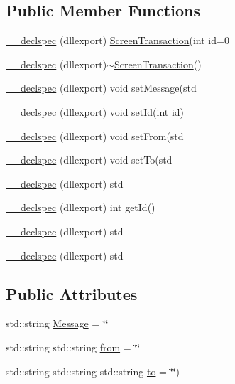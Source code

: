 \subsection*{Public Member Functions}
\begin{DoxyCompactItemize}
\item 
\hyperlink{class_screen_transaction_a790b2aa852dd7fb5174346c8a2109af0}{\-\_\-\-\_\-declspec} (dllexport) \hyperlink{class_screen_transaction}{Screen\-Transaction}(int id=0
\item 
\hyperlink{class_screen_transaction_a4878fcb1964d5a73540e19228be63e0e}{\-\_\-\-\_\-declspec} (dllexport)$\sim$\hyperlink{class_screen_transaction}{Screen\-Transaction}()
\item 
\hyperlink{class_screen_transaction_a21b0eec8e5cd2282518e5fcb5c4bd55a}{\-\_\-\-\_\-declspec} (dllexport) void set\-Message(std
\item 
\hyperlink{class_screen_transaction_af71fe995bec2686f63f98e526c962e32}{\-\_\-\-\_\-declspec} (dllexport) void set\-Id(int id)
\item 
\hyperlink{class_screen_transaction_a0ebe388c719d9f29ba16cd79635bb9e6}{\-\_\-\-\_\-declspec} (dllexport) void set\-From(std
\item 
\hyperlink{class_screen_transaction_a180431fd080d3e413e5afb47cd3e3748}{\-\_\-\-\_\-declspec} (dllexport) void set\-To(std
\item 
\hyperlink{class_screen_transaction_a551f1620f4cf1b5154560de35dd8d80e}{\-\_\-\-\_\-declspec} (dllexport) std
\item 
\hyperlink{class_screen_transaction_aa01a56ff19258c76a0f948438f816373}{\-\_\-\-\_\-declspec} (dllexport) int get\-Id()
\item 
\hyperlink{class_screen_transaction_a551f1620f4cf1b5154560de35dd8d80e}{\-\_\-\-\_\-declspec} (dllexport) std
\item 
\hyperlink{class_screen_transaction_a551f1620f4cf1b5154560de35dd8d80e}{\-\_\-\-\_\-declspec} (dllexport) std
\end{DoxyCompactItemize}
\subsection*{Public Attributes}
\begin{DoxyCompactItemize}
\item 
std\-::string \hyperlink{class_screen_transaction_a212573d9bccda5210fb4bf82211fce07}{Message} = \char`\"{}\char`\"{}
\item 
std\-::string std\-::string \hyperlink{class_screen_transaction_a1bf44d50b78f0e50807314e9e7246332}{from} = \char`\"{}\char`\"{}
\item 
std\-::string std\-::string std\-::string \hyperlink{class_screen_transaction_a00495b6a53c3cfc8bfe861138841a5c5}{to} = \char`\"{}\char`\"{})
\end{DoxyCompactItemize}
